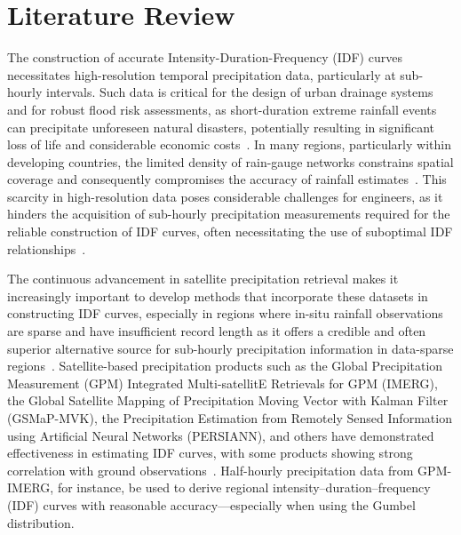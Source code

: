 \section{Literature Review}
The construction of accurate Intensity-Duration-Frequency (IDF) curves necessitates high-resolution temporal precipitation data, particularly at sub-hourly intervals. Such data is critical for the design of urban drainage systems and for robust flood risk assessments, as short-duration extreme rainfall events can precipitate unforeseen natural disasters, potentially resulting in significant loss of life and considerable economic costs~\cite{hess-28-375-2024}.
In many regions, particularly within developing countries, the limited density of rain-gauge networks constrains spatial coverage and consequently compromises the accuracy of rainfall estimates~\cite{basumatary2016}. This scarcity in high-resolution data poses considerable challenges for engineers, as it hinders the acquisition of sub-hourly precipitation measurements required for the reliable construction of IDF curves, often necessitating the use of suboptimal IDF relationships~\cite{basumatary2016}.

The continuous advancement in satellite precipitation retrieval makes it increasingly important to develop methods that incorporate these datasets in constructing IDF curves, especially in regions where in-situ rainfall observations are sparse and have insufficient record length as it offers a credible and often superior alternative source for sub-hourly precipitation information in data-sparse regions~\cite{ombadi2018}. Satellite-based precipitation products such as the Global Precipitation Measurement (GPM) Integrated Multi-satellitE Retrievals for GPM (IMERG), the Global Satellite Mapping of Precipitation Moving Vector with Kalman Filter (GSMaP-MVK), the Precipitation Estimation from Remotely Sensed Information using Artificial Neural Networks (PERSIANN), and others have demonstrated effectiveness in estimating IDF curves, with some products showing strong correlation with ground observations~\cite{ombadi2018, rs14195032}. Half-hourly precipitation data from GPM-IMERG, for instance, be used to derive regional intensity–duration–frequency (IDF) curves with reasonable accuracy—especially when using the Gumbel distribution.~\cite{rs14195032}

\vspace{1em}

